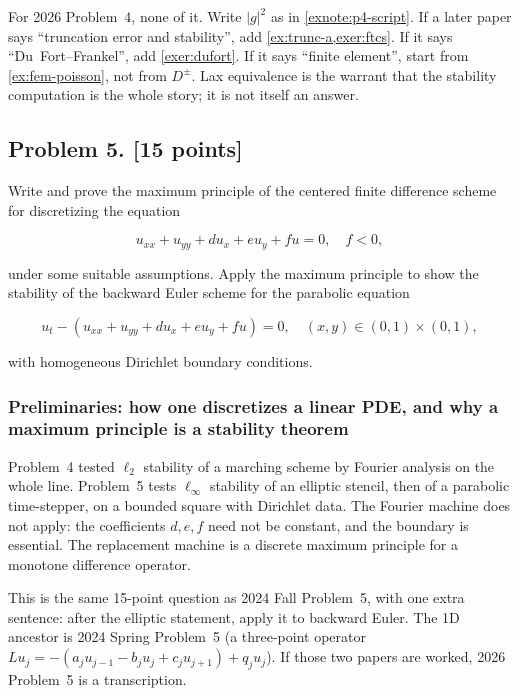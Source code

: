 \documentclass[11pt,a4paper]{article}
\begin{document}
\begin{examnote}
\label{exnote:p4-syllabus}
For 2026 Problem~4, none of it. Write \(|g|^2\) as in \cref{exnote:p4-script}. If a later paper says ``truncation error and stability'', add \cref{ex:trunc-a,exer:ftcs}. If it says ``Du~Fort--Frankel'', add \cref{exer:dufort}. If it says ``finite element'', start from \cref{ex:fem-poisson}, not from \(D^\pm\). Lax equivalence is the warrant that the stability computation is the whole story; it is not itself an answer.
\end{examnote}


\subsection{Problem 5. [15 points]}
Write and prove the maximum principle of the centered finite difference scheme for discretizing the equation

\[
u_{xx} + u_{yy} + d u_{x} + e u_{y} + f u = 0, \quad f < 0,
\]

under some suitable assumptions. Apply the maximum principle to show the stability of the backward Euler scheme for the parabolic equation

\[
u_{t} - (u_{xx} + u_{yy} + d u_{x} + e u_{y} + f u) = 0, \quad (x, y) \in (0, 1) \times (0, 1),
\]

with homogeneous Dirichlet boundary conditions.

\setcounter{section}{5}
\setcounter{theorem}{0}
\setcounter{definition}{0}
\setcounter{remark}{0}
\setcounter{note}{0}

\subsubsection{Preliminaries: how one discretizes a linear PDE, and why a maximum principle is a stability theorem}

Problem~4 tested \(\ell_2\) stability of a marching scheme by Fourier analysis on the whole line. Problem~5 tests \(\ell_\infty\) stability of an elliptic stencil, then of a parabolic time-stepper, on a bounded square with Dirichlet data. The Fourier machine does not apply: the coefficients \(d,e,f\) need not be constant, and the boundary is essential. The replacement machine is a discrete maximum principle for a monotone difference operator.

This is the same 15-point question as 2024 Fall Problem~5, with one extra sentence: after the elliptic statement, apply it to backward Euler. The 1D ancestor is 2024 Spring Problem~5 (a three-point operator \(Lu_j=-(a_j u_{j-1}-b_j u_j+c_j u_{j+1})+q_j u_j\)). If those two papers are worked, 2026 Problem~5 is a transcription.
\end{document}
